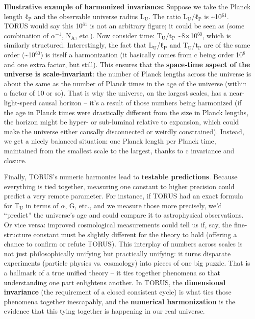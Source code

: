 \documentclass[]{article}
\newcommand{\subscript}[1]{\ensuremath{_{\mathrm{#1}}}}
\newcommand{\superscript}[1]{\ensuremath{^{\mathrm{#1}}}}
\begin{document}
\textbf{Illustrative example of harmonized invariance:} Suppose we take
the Planck length
ℓ\subscript{P} and the
observable universe radius
L\subscript{U}. The ratio
L\subscript{U}/ℓ\subscript{P}
is \textasciitilde{}10\superscript{61}. TORUS would say this 10\superscript{61} is not an
arbitrary figure; it could be seen as (some combination of $\alpha\superscript{−1}$,
N\subscript{A}, etc.). Now
consider time:
T\subscript{U}/t\subscript{P}
\textasciitilde{}8×10\superscript{60}, which is similarly structured.
Interestingly, the fact that
L\subscript{U}/ℓ\subscript{P}
and
T\subscript{U}/t\subscript{P}
are of the same order (\textasciitilde{}10\superscript{60}) is itself a
harmonization (it basically comes from c being order 10\superscript{8} and one
extra factor, but still). This ensures that the \textbf{space-time
aspect of the universe is scale-invariant}: the number of Planck lengths
across the universe is about the same as the number of Planck times in
the age of the universe (within a factor of 10 or so). That is why the
universe, on the largest scales, has a near-light-speed causal horizon
-- it's a result of those numbers being harmonized (if the age in Planck
times were drastically different from the size in Planck lengths, the
horizon might be hyper- or sub-luminal relative to expansion, which
could make the universe either causally disconnected or weirdly
constrained). Instead, we get a nicely balanced situation: one Planck
length per Planck time, maintained from the smallest scale to the
largest, thanks to c invariance and closure​.

Finally, TORUS's numeric harmonies lead to \textbf{testable
predictions}. Because everything is tied together, measuring one
constant to higher precision could predict a very remote parameter. For
instance, if TORUS had an exact formula for
T\subscript{U} in terms of
$\alpha$, G, etc., and we measure those more precisely, we'd ``predict'' the
universe's age and could compare it to astrophysical observations. Or
vice versa: improved cosmological measurements could tell us if, say,
the fine-structure constant must be slightly different for the theory to
hold (offering a chance to confirm or refute TORUS). This interplay of
numbers across scales is not just philosophically unifying but
practically unifying: it turns disparate experiments (particle physics
vs. cosmology) into pieces of one big puzzle. That is a hallmark of a
true unified theory -- it ties together phenomena so that understanding
one part enlightens another. In TORUS, the \textbf{dimensional
invariance} (the requirement of a closed consistent cycle) is what ties
those phenomena together inescapably, and the \textbf{numerical
harmonization} is the evidence that this tying together is happening in
our real universe​.
\end{document}
